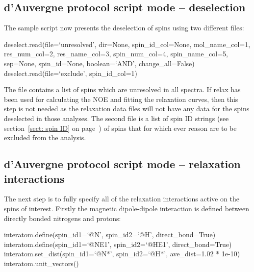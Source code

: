 \begin{htmlonly}
\begin{htmlonly}

\subsection{d'Auvergne protocol script mode -- deselection}

The sample script now presents the deselection of spins using two different files:

\begin{exampleenv}
deselect.read(file=`unresolved', dir=None, spin\_id\_col=None, mol\_name\_col=1, res\_num\_col=2, res\_name\_col=3, spin\_num\_col=4, spin\_name\_col=5, sep=None, spin\_id=None, boolean=`AND', change\_all=False) \\
deselect.read(file=`exclude', spin\_id\_col=1)
\end{exampleenv}

The  file contains a list of spins which are unresolved in all spectra.  If relax has been used for calculating the NOE and fitting the relaxation curves, then this step is not needed as the relaxation data files will not have any data for the spins deselected in those analyses.  The second file  is a list of spin ID strings (see section~\ref{sect: spin ID} on page~\pageref{sect: spin ID}) of spins that for which ever reason are to be excluded from the analysis.



\subsection{d'Auvergne protocol script mode -- relaxation interactions}

The next step is to fully specify all of the relaxation interactions active on the spins of interest.  Firstly the magnetic dipole-dipole interaction is defined between directly bonded nitrogens and protons:

\begin{exampleenv}
interatom.define(spin\_id1=`@N', spin\_id2=`@H', direct\_bond=True) \\
interatom.define(spin\_id1=`@NE1', spin\_id2=`@HE1', direct\_bond=True) \\
interatom.set\_dist(spin\_id1=`@N*', spin\_id2=`@H*', ave\_dist=1.02 * 1e-10) \\
interatom.unit\_vectors()
\end{exampleenv}


\end{htmlonly}
\end{htmlonly}
